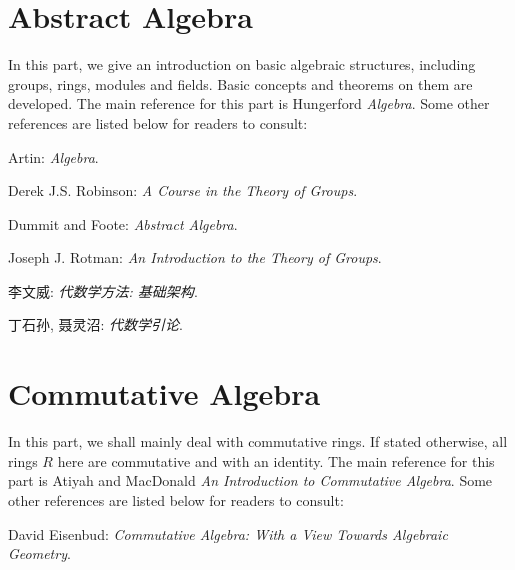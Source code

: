 \documentclass{article}
\begin{document}
\part{Abstract Algebra}
In this part, we give an introduction on basic algebraic structures, including groups, rings, modules and fields. Basic concepts and theorems on them are developed. The main reference for this part is Hungerford \textit{Algebra}. Some other references are listed below for readers to consult: \par
[1] Artin: \textit{Algebra}.\par
[2] Derek J.S. Robinson: \textit{A Course in the Theory of Groups}.\par
[3] Dummit and Foote: \textit{Abstract Algebra}.\par
[4] Joseph J. Rotman: \textit{An Introduction to the Theory of Groups}.\par
[5] 李文威: \textit{代数学方法: 基础架构}.\par
[6] 丁石孙, 聂灵沼: \textit{代数学引论}.
\newpage

\newpage

\newpage

\newpage

\newpage

\newpage

\newpage
\part{Commutative Algebra}
In this part, we shall mainly deal with commutative rings. If stated otherwise, all rings $R$ here are commutative and with an identity. The main reference for this part is Atiyah and MacDonald \textit{An Introduction to Commutative Algebra}. Some other  references are listed below for readers to consult: \par
[1] David Eisenbud: \textit{Commutative Algebra: With a View Towards Algebraic Geometry}.
\newpage

\newpage

\newpage
\begin{appendices}

\end{appendices}
\end{document}
